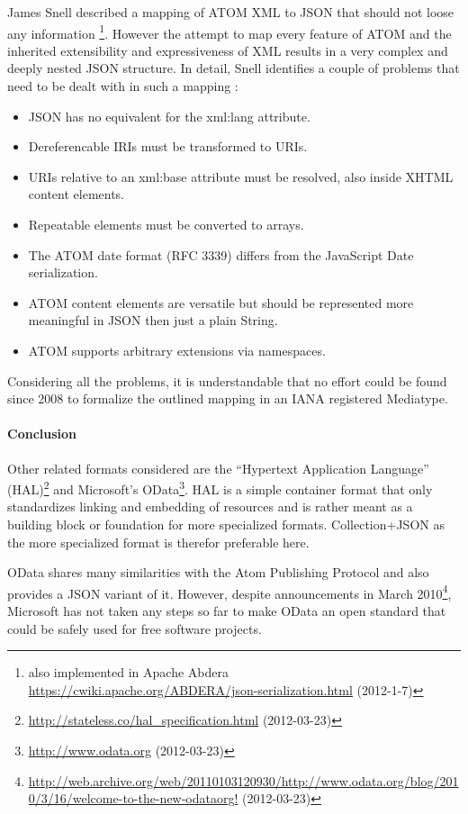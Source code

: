 \documentclass[11pt,a4paper,headsepline,twoside]{scrartcl}		%
\newcommand{\citeurl}[2]{\url{#1} (#2)}
\begin{document}
James Snell described a mapping of ATOM XML to JSON that should not loose any
information \cite{Snell2008}\footnote{also implemented in Apache Abdera
  \citeurl{https://cwiki.apache.org/ABDERA/json-serialization.html}{2012-1-7}}. However
the attempt to map every feature of ATOM and the inherited extensibility and
expressiveness of XML results in a very complex and deeply nested JSON
structure. In detail, Snell identifies a couple of problems that need to be
dealt with in such a mapping \cite{Snell2008}:

\begin{itemize}
  \item JSON has no equivalent for the xml:lang attribute.
  \item Dereferencable IRIs must be transformed to URIs.
  \item URIs relative to an xml:base attribute must be resolved, also inside XHTML content elements.
  \item Repeatable elements must be converted to arrays.
  \item The ATOM date format (RFC 3339) differs from the JavaScript Date serialization.
  \item ATOM content elements are versatile but should be represented more meaningful in JSON then just a plain String.
  \item ATOM supports arbitrary extensions via namespaces.
\end{itemize}

Considering all the problems, it is understandable that no effort could be found
since 2008 to formalize the outlined mapping in an IANA registered Mediatype.

\paragraph{Conclusion}

Other related formats considered are the ``Hypertext Application Language''
(HAL)\footnote{\citeurl{http://stateless.co/hal_specification.html}{2012-03-23}}
and Microsoft's OData\footnote{\citeurl{http://www.odata.org}{2012-03-23}}. HAL
is a simple container format that only standardizes linking and embedding of
resources and is rather meant as a building block or foundation for more
specialized formats. Collection+JSON as the more specialized format is therefor
preferable here.

OData shares many similarities with the Atom Publishing Protocol and also
provides a JSON variant of it. However, despite announcements in March
2010\footnote{\citeurl{http://web.archive.org/web/20110103120930/http://www.odata.org/blog/2010/3/16/welcome-to-the-new-odataorg!}{2012-03-23}},
Microsoft has not taken any steps so far to make OData an open standard that
could be safely used for free software projects.
\end{document}
